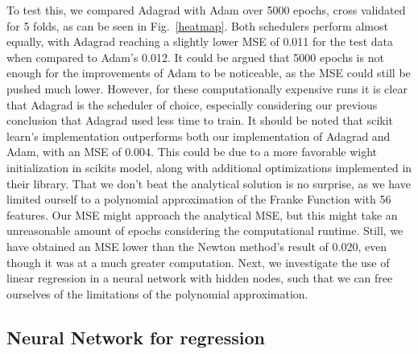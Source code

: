 \documentclass[onecolumn,10pt,cleanfoot]{asme2ej}
\begin{document}
To test this, we compared Adagrad with Adam over 5000 epochs, cross validated for 5 folds, as can be seen in Fig.~\ref{heatmap}. Both schedulers perform almost equally, with Adagrad reaching a slightly lower MSE of 0.011 for the test data when compared to Adam's 0.012. It could be argued that 5000 epochs is not enough for the improvements of Adam to be noticeable, as the MSE could still be pushed much lower. However, for these computationally expensive runs it is clear that Adagrad is the scheduler of choice, especially considering our previous conclusion that Adagrad used less time to train. It should be noted that scikit learn's implementation outperforms both our implementation of Adagrad and Adam, with an MSE of 0.004. This could be due to a more favorable wight initialization in scikits model, along with additional optimizations implemented in their library. That we don't beat the analytical solution is no surprise, as we have limited ourself to a polynomial approximation of the Franke Function with 56 features. Our MSE might approach the analytical MSE, but this might take an unreasonable amount of epochs considering the computational runtime. Still, we have obtained an MSE lower than the Newton method's result of 0.020, even though it was at a much greater computation. Next, we investigate the use of linear regression in a neural network with hidden nodes, such that we can free ourselves of the limitations of the polynomial approximation.

\subsection{Neural Network for regression}
\end{document}
